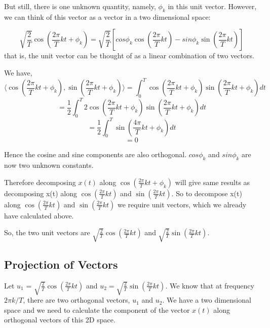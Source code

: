 \noindent
But still, there is one unknown quantity, namely, $\phi_k$ in this unit vector. However, we can think of this vector as a vector in a two dimensional space:

\begin{equation*}\sqrt{\frac{2}{T}}\cos (\frac{2\pi}{T}kt + \phi_k) = \sqrt{\frac{2}{T}}[cos\phi_k\cos (\frac{2\pi}{T}kt) - sin\phi_k\sin (\frac{2\pi}{T}kt)] \end{equation*}
that is, the unit vector can be thought of as a linear combination of two vectors.

\noindent
We have,
\begin{equation*}
\langle \cos (\frac{2\pi}{T}kt + \phi_k), \sin (\frac{2\pi}{T}kt + \phi_k) \rangle = \int_{0}^{T}  \cos (\frac{2\pi}{T}kt + \phi_k) \sin (\frac{2\pi}{T}kt + \phi_k) dt  \end{equation*}
\begin{equation*} = \frac{1}{2} \int_{0}^{T} 2 \cos (\frac{2\pi}{T}kt + \phi_k) \sin (\frac{2\pi}{T}kt + \phi_k) dt  \end{equation*}
\begin{equation*} = \frac{1}{2} \int_{0}^{T} \sin (\frac{4\pi}{T}kt + \phi_k) dt \end{equation*}
\begin{equation*} = 0 \end{equation*}

\noindent
 Hence the cosine and sine components are also orthogonal. $cos\phi_k$ and $sin\phi_k$ are now two unknown constants.

\noindent
Therefore decomposing $x(t)$ along $\cos (\frac{2\pi}{T}kt + \phi_k)$ will give same results as decomposing x(t) along  $\cos (\frac{2\pi}{T}kt)$ and $\sin (\frac{2\pi}{T}kt)$. So to decompose x(t) along $\cos (\frac{2\pi}{T}kt)$ and $\sin (\frac{2\pi}{T}kt)$ we require unit vectors, which we already have calculated above.
   
\noindent
   So, the two unit vectors are $\sqrt{\frac{2}{T}}\cos (\frac{2\pi}{T}kt)$ and $\sqrt{\frac{2}{T}}\sin (\frac{2\pi}{T}kt)$.
  
  \subsection{Projection of Vectors}
\noindent
Let $u_1$ = $\sqrt{\frac{2}{T}}\cos (\frac{2\pi}{T}kt)$ and $u_2 = \sqrt{\frac{2}{T}}\sin (\frac{2\pi}{T}kt)$. We know that at frequency $2\pi k/T$, there are two orthogonal vectors, $u_1$ and $u_2$. We have a two dimensional space and we need to calculate the component of the vector $x(t)$ along orthogonal vectors of this 2D space.
  
